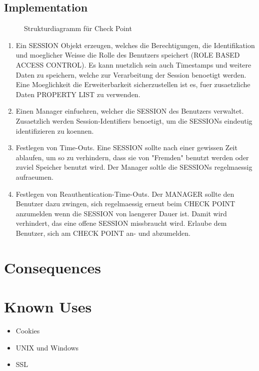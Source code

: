 \subsection{Implementation}

\begin{figure}[H]
  \centering
  
  \caption{Strukturdiagramm f\"ur Check Point}
\end{figure}

\begin{enumerate}
  \item Ein SESSION Objekt erzeugen, welches die Berechtigungen, die Identifikation und moeglicher Weisse die Rolle des Benutzers speichert (ROLE BASED ACCESS CONTROL). Es kann nuetzlich sein auch Timestamps und weitere Daten zu speichern, welche zur Verarbeitung der Session benoetigt werden. Eine Moeglichkeit die Erweiterbarkeit sicherzustellen ist es, fuer zusaetzliche Daten PROPERTY LIST zu verwenden.
  \item Einen Manager einfuehren, welcher die SESSION des Benutzers verwaltet. Zusaetzlich werden Session-Identifiers benoetigt, um die SESSIONs eindeutig identifizieren zu koennen.
  \item Festlegen von Time-Outs. Eine SESSION sollte nach einer gewissen Zeit ablaufen, um so zu verhindern, dass sie von "Fremden" benutzt werden oder zuviel Speicher benutzt wird. Der Manager soltle die SESSIONs regelmaessig aufraeumen.
  \item Festlegen von Reauthentication-Time-Outs. Der MANAGER sollte den Benutzer dazu zwingen, sich regelmaessig erneut beim CHECK POINT anzumelden wenn die SESSION von laengerer Dauer ist. Damit wird verhindert, das eine offene SESSION missbraucht wird.
    Erlaube dem Benutzer, sich am CHECK POINT an- und abzumelden.
\end{enumerate}


\section{Consequences}
\begin{itemize}
\end{itemize}

\section{Known Uses}
\begin{itemize}
  \item Cookies
  \item UNIX und Windows
  \item SSL
\end{itemize}

